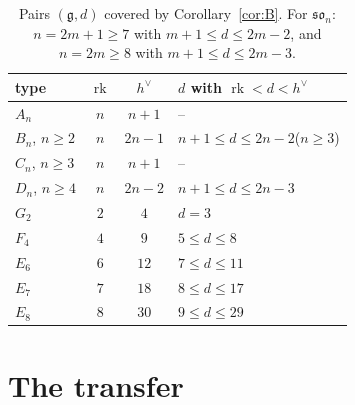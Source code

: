 \documentclass[11pt]{article}
\theoremstyle{definition}
\newcommand{\g}{\mathfrak g}
\newcommand{\rk}{\operatorname{rk}}
\newcommand{\hv}{h^\vee}
\begin{document}
\begin{table}[ht]
\centering\small
\begin{tabular}{lccl}
\toprule
type & $\rk$ & $\hv$ & $d$ with $\rk<d<\hv$\\
\midrule
$A_n$ & $n$ & $n+1$ & --\\
$B_n$, $n\ge2$ & $n$ & $2n-1$ & $n+1\le d\le 2n-2$\quad ($n\ge3$)\\
$C_n$, $n\ge3$ & $n$ & $n+1$ & --\\
$D_n$, $n\ge4$ & $n$ & $2n-2$ & $n+1\le d\le 2n-3$\\
$G_2$ & $2$ & $4$ & $d=3$\\
$F_4$ & $4$ & $9$ & $5\le d\le8$\\
$E_6$ & $6$ & $12$ & $7\le d\le11$\\
$E_7$ & $7$ & $18$ & $8\le d\le17$\\
$E_8$ & $8$ & $30$ & $9\le d\le29$\\
\bottomrule
\end{tabular}
\caption{Pairs $(\g,d)$ covered by Corollary~\ref{cor:B}. For $\mathfrak{so}_n$: $n=2m+1\ge7$ with $m+1\le d\le2m-2$, and $n=2m\ge8$ with $m+1\le d\le2m-3$.}\label{tab:windows}
\end{table}

\section{The transfer}\label{sec:transfer}
\end{document}
